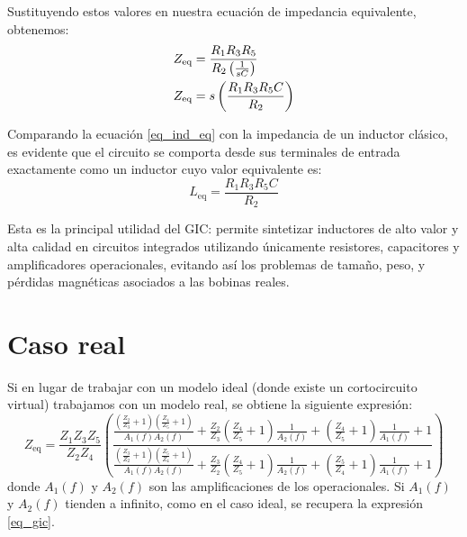 Sustituyendo estos valores en nuestra ecuación de impedancia equivalente, obtenemos:
\begin{align}
  Z_\text{eq} &= \frac{R_1 R_3 R_5}{R_2 \left(\frac{1}{sC}\right)} \notag\\
  Z_\text{eq} &= s \left( \frac{R_1 R_3 R_5 C}{R_2} \right) \label{eq_ind_eq}
\end{align}

Comparando la ecuación \eqref{eq_ind_eq} con la impedancia de un inductor clásico, es evidente que el circuito se comporta desde sus terminales de entrada exactamente como un inductor cuyo valor equivalente es:
\[
  L_\text{eq} = \frac{R_1 R_3 R_5 C}{R_2}
\]

Esta es la principal utilidad del GIC: permite sintetizar inductores de alto valor y alta calidad en circuitos integrados utilizando únicamente resistores, capacitores y amplificadores operacionales, evitando así los problemas de tamaño, peso, y pérdidas magnéticas asociados a las bobinas reales.

\section{Caso real}

Si en lugar de trabajar con un modelo ideal (donde existe un cortocircuito virtual) trabajamos con un modelo real, se obtiene la siguiente expresión:
\[
  Z_\text{eq}=\frac{Z_1Z_3Z_5}{Z_2Z_4}\left(\frac{
    \frac{\left(\frac{Z_2}{Z_3}+1\right)\left(\frac{Z_4}{Z_5}+1\right)}{A_1(f)A_2(f)}+\frac{Z_2}{Z_3}\left(\frac{Z_4}{Z_5}+1\right)\frac{1}{A_2(f)}+\left(\frac{Z_4}{Z_5}+1\right)\frac{1}{A_1(f)}+1}{
    \frac{\left(\frac{Z_3}{Z_2}+1\right)\left(\frac{Z_5}{Z_4}+1\right)}{A_1(f)A_2(f)}+\frac{Z_3}{Z_2}\left(\frac{Z_4}{Z_5}+1\right)\frac{1}{A_2(f)}+\left(\frac{Z_5}{Z_4}+1\right)\frac{1}{A_1(f)}+1
  }\right)
\]
donde \(A_1(f)\) y \(A_2(f)\) son las amplificaciones de los operacionales. Si \(A_1(f)\) y \(A_2(f)\) tienden a infinito, como en el caso ideal, se recupera la expresión \eqref{eq_gic}.


